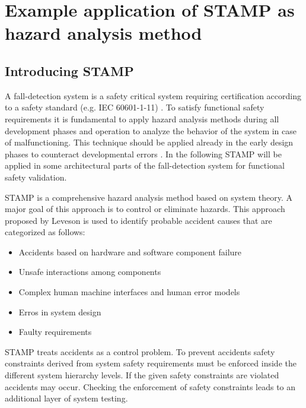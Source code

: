 \documentclass[review]{elsarticle}
\begin{document}
\section{Example application of STAMP as hazard analysis method}
\label{sec:STAMP}

\subsection{Introducing STAMP}
A fall-detection system is a safety critical system requiring certification according to a safety standard (e.g. IEC 60601-1-11) \cite{international2005medical}. To satisfy functional safety requirements it is fundamental to apply hazard analysis methods during all development phases and operation to analyze the behavior of the system in case of malfunctioning. This technique should be applied already in the early design phases to counteract developmental errors \cite{STAMPThesis}. In the following STAMP will be applied in some architectural parts of the fall-detection system for functional safety validation.

STAMP is a comprehensive hazard analysis method based on system theory. A major goal of this approach is to control or eliminate hazards. This approach proposed by Leveson \cite{leveson2011engineering} is used to identify probable accident causes that are categorized as follows:
\begin{itemize}
	\item Accidents based on hardware and software component failure
	\item Unsafe interactions among components
	\item Complex human machine interfaces and human error models
	\item Erros in system design
	\item Faulty requirements
\end{itemize}  
STAMP treats accidents as a control problem. To prevent accidents safety constraints derived from system safety requirements must be enforced inside the different system hierarchy levels. If the given safety constraints are violated accidents may occur. Checking the enforcement of safety constraints leads to an additional layer of system testing. 
\end{document}
